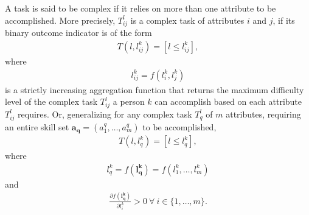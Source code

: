 \documentclass[hidelinks, nonatbib]{elsarticle}
\begin{document}
\begin{definition}
    \label{complex_task}
    A task is said to be complex if it relies on more than one attribute to be accomplished. More precisely, $T_{ij}^{l}$ is a complex task of attributes $i$ and $j$, if its binary outcome indicator is of the form
    \begin{gather}
        T(l, l_{ij}^{k}) =
        [l \leq l_{ij}^{k}],
    \end{gather}
    where
    \begin{gather}
        l_{ij}^{k} = f(l_{i}^{k}, l_{j}^{k})
    \end{gather}
    is a strictly increasing aggregation function that returns the maximum difficulty level of the complex task $T_{ij}^{l}$ a person $k$ can accomplish based on each attribute $T_{ij}^{l}$ requires. Or, generalizing for any complex task $T_{q}^{l}$ of $m$ attributes, requiring an entire skill set $\boldsymbol{a_q} = (a_{1}^{q}, \dots, a_{m}^{q})$ to be accomplished, 
    \begin{gather}
        T(l, l_{q}^{k}) =
        [l \leq l_{q}^{k}],
    \end{gather}
    where
    \begin{gather}
        l_{q}^{k} = 
        f(\boldsymbol{l_{q}^{k}}) =
        f(l_{1}^{k}, \dots, l_{m}^{k})
    \end{gather}
    and 
    \begin{gather}
        \frac{
            \partial
            f(\boldsymbol{l_{q}^{k}})
        }{
            \partial 
            l_{i}^{k}
        } > 0
        \
        \forall 
        \
        i \in \{1, \dots, m\}
        .
    \end{gather}
        

\end{definition}
\end{document}
